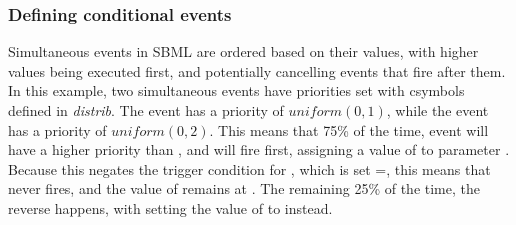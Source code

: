 \documentclass[draftspec]{sbmlpkgspec}
\newcommand{\distribshort}{\emph{distrib}\xspace}
\begin{document}
\subsubsection{Defining conditional events}

Simultaneous events in SBML are ordered based on their \Priority values, with higher values being executed first, and potentially cancelling events that fire after them.  In this example, two simultaneous events have priorities set with csymbols defined in \distribshort.  The event  has a priority of $uniform(0,1)$, while the event  has a priority of $uniform(0,2)$.  This means that 75\% of the time, event  will have a higher priority than , and will fire first, assigning a value of  to parameter .  Because this negates the trigger condition for , which is set =, this means that  never fires, and the value of  remains at .  The remaining 25\% of the time, the reverse happens, with  setting the value of  to  instead.
\end{document}
